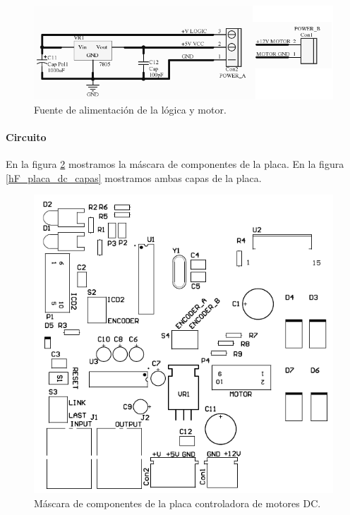 \begin{figure}
	\centering
	\includegraphics[scale=.3]{figuras/dc_schemaFuente.png}
	\caption{Fuente de alimentaci\'on de la l\'ogica y motor.}
	\label{hF_placa_dc_schema5}
\end{figure}

\paragraph{Circuito}
\label{h_placas_motorDC_circuito}

En la figura \ref{hF_placa_dc_componentes} mostramos la m\'ascara de componentes de la placa.
En la figura \ref{hF_placa_dc_capas} mostramos ambas capas de la placa.

\begin{figure}
	\centering
	\includegraphics[scale=.3]{figuras/dc_componentes.png}
	\caption{M\'ascara de componentes de la placa controladora de motores DC.}
	\label{hF_placa_dc_componentes}
\end{figure}

